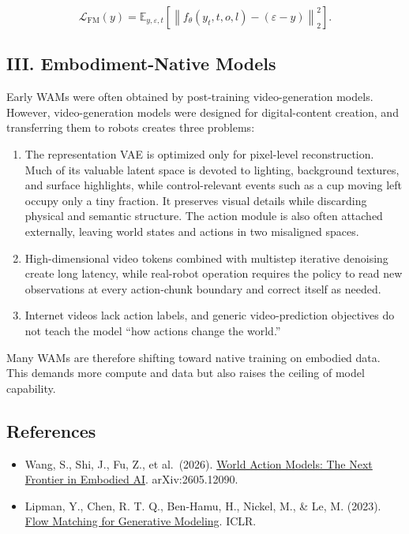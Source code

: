 \[
\mathcal{L}_{\mathrm{FM}}(y)=\mathbb{E}_{y,\varepsilon,t}\left[\left\|f_\theta(y_t,t,o,l)-(\varepsilon-y)\right\|_2^2\right].
\]

\hypertarget{iii.-embodiment-native-models}{%
\subsection{III. Embodiment-Native Models}\label{iii.-embodiment-native-models}}

Early WAMs were often obtained by post-training video-generation models. However, video-generation models were designed for digital-content creation, and transferring them to robots creates three problems:

\begin{enumerate}
\def\labelenumi{\arabic{enumi}.}
\item
  The representation VAE is optimized only for pixel-level reconstruction. Much of its valuable latent space is devoted to lighting, background textures, and surface highlights, while control-relevant events such as a cup moving left occupy only a tiny fraction. It preserves visual details while discarding physical and semantic structure. The action module is also often attached externally, leaving world states and actions in two misaligned spaces.
\item
  High-dimensional video tokens combined with multistep iterative denoising create long latency, while real-robot operation requires the policy to read new observations at every action-chunk boundary and correct itself as needed.
\item
  Internet videos lack action labels, and generic video-prediction objectives do not teach the model ``how actions change the world.''
\end{enumerate}

Many WAMs are therefore shifting toward native training on embodied data. This demands more compute and data but also raises the ceiling of model capability.

\FloatBarrier
{}
\hypertarget{references-158}{%
\subsection{References}\label{references-158}}

\vspace{0.25em}
\begin{itemize}
\tightlist
\item
  Wang, S., Shi, J., Fu, Z., et al.~(2026). \href{https://arxiv.org/abs/2605.12090}{World Action Models: The Next Frontier in Embodied AI}. arXiv:2605.12090.
\item
  Lipman, Y., Chen, R. T. Q., Ben-Hamu, H., Nickel, M., \& Le, M. (2023). \href{https://arxiv.org/abs/2210.02747}{Flow Matching for Generative Modeling}. ICLR.
\end{itemize}

\clearpage
